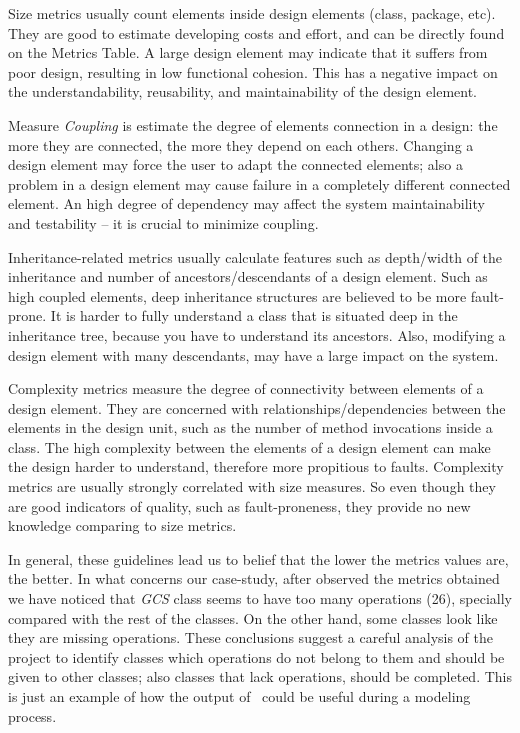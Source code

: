 Size metrics usually count elements inside design elements (class, package, etc).
They are good to estimate developing costs and effort, and can be directly found on the Metrics Table.
A large design element may indicate that it suffers from poor design, resulting in low functional cohesion. This has a negative impact on the understandability, reusability, and maintainability of the design element.

Measure \emph{Coupling} is estimate the degree of elements connection in a design: the more they are connected, the more they depend on each others. 
Changing a design element may force the user to adapt the connected elements; also a problem in a design element may cause failure in a completely different connected element. 
An high degree of dependency may affect the system maintainability and testability -- it is crucial to minimize coupling.

Inheritance-related metrics usually calculate features such as depth/width of the inheritance and number of ancestors/descendants of a design element. Such as high coupled elements, deep inheritance structures are believed to be more fault-prone. It is harder to fully understand a class that is situated deep in the inheritance tree, because you have to understand its ancestors. Also, modifying a design element with many descendants, may have a large impact on the system.

Complexity metrics measure the degree of connectivity between elements of a design element. They are concerned with relationships/dependencies between the elements in the design unit, such as the number of method invocations inside a class. The high complexity between the elements of a design element can make the design harder to understand, therefore more propitious to faults. Complexity metrics are usually strongly correlated with size measures. So even though they are good indicators of quality, such as fault-proneness, they provide no new knowledge comparing to size metrics.

In general, these guidelines lead us to belief that the lower the metrics values are, the better.
In what concerns our case-study, after observed the metrics obtained we have noticed that \emph{GCS} class seems to have too many operations (26), specially compared with the rest of the classes.
On the other hand, some classes look like they are missing operations.
These conclusions suggest a careful analysis of the project to identify classes which operations do not belong to them and should be given to other classes; also classes that lack operations, should be completed.
This is just an example of how the output of \sdmetrics\ could be useful during a modeling process.

